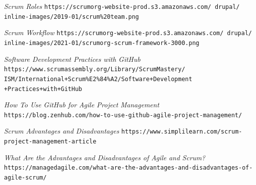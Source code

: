 \documentclass{beamer}
\begin{document}
\begin{frame}[allowframebreaks]

	\begin{thebibliography}{10}


	\textit{Scrum Roles}
	\texttt{https://scrumorg-website-prod.s3.amazonaws.com/
	drupal/	inline-images/2019-01/scrum\%20team.png}

	\textit{Scrum Workflow}
	\texttt{https://scrumorg-website-prod.s3.amazonaws.com/
	drupal/	inline-images/2021-01/scrumorg-scrum-framework-3000.png}

	\textit{Software Development Practices with GitHub}
	\texttt{https://www.scrumassembly.org/Library/ScrumMastery/\\
	ISM/International+Scrum\%E2\%84\%A2/Software+Development\\
	+Practices+with+GitHub}

	\framebreak

	\textit{How To Use GitHub for Agile Project Management}
	\texttt{https://blog.zenhub.com/how-to-use-github-agile-project-management/}

	\textit{Scrum Advantages and Disadvantages}
	\texttt{https://www.simplilearn.com/scrum-project-management-article}

	\textit{What Are the Advantages and Disadvantages of Agile and Scrum?}
	\texttt{https://managedagile.com/what-are-the-advantages-and-disadvantages-of-agile-scrum/}

	\end{thebibliography}

\end{frame}
\end{document}
